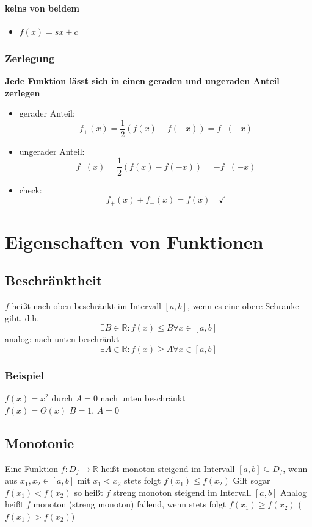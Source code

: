 \documentclass[a4paper]{scrartcl}
\DeclareMathOperator{\Forall}{\forall}
\begin{document}
\paragraph{keins von beidem}
\label{sec-7-2-1-3}
\begin{itemize}
\item $f(x) = s x + c$
\end{itemize}
\subsubsection{Zerlegung}
\label{sec-7-2-2}

\textbf{Jede Funktion lässt sich in einen geraden und ungeraden Anteil zerlegen}
\begin{itemize}
\item gerader Anteil: \[f_+(x)=\frac{1}{2}\left(f(x) + f(-x)\right)=f_+(-x)\]
\item ungerader Anteil: \[f_-(x)=\frac{1}{2}\left(f(x)-f(-x)\right)=-f_-(-x)\]
\item check: \[f_+(x) + f_-(x)=f(x)\quad\checkmark\]
\end{itemize}
\section{Eigenschaften von Funktionen}
\label{sec-8}
\subsection{Beschränktheit}
\label{sec-8-1}
$f$ heißt nach oben beschränkt im Intervall $[a,b]$, wenn es eine obere Schranke gibt, d.h. \[\exists B\in\mathbb{R}: f(x)\leq B\Forall x\in [a,b]\]
analog: nach unten beschränkt \[\exists A\in\mathbb{R}: f(x)\geq A\Forall x\in [a,b]\]
\subsubsection{Beispiel}
\label{sec-8-1-1}
$f(x) = x^2$ durch $A=0$ nach unten beschränkt\\
    $f(x) = \Theta(x)$ $B=1$, $A=0$
\subsection{Monotonie}
\label{sec-8-2}
Eine Funktion $f:D_f\to\mathbb{R}$ heißt monoton steigend im Intervall $[a,b] \subseteq D_f$, wenn aus $x_1,x_2\in [a,b]$ mit $x_1<x_2$ stets folgt $f(x_1) \leq f(x_2)$
Gilt sogar $f(x_1) < f(x_2)$ so heißt $f$ streng monoton steigend im Intervall $[a,b]$
Analog heißt $f$ monoton (streng monoton) fallend, wenn stets folgt $f(x_1) \geq f(x_2)$ ($f(x_1) > f(x_2)$)
\end{document}
